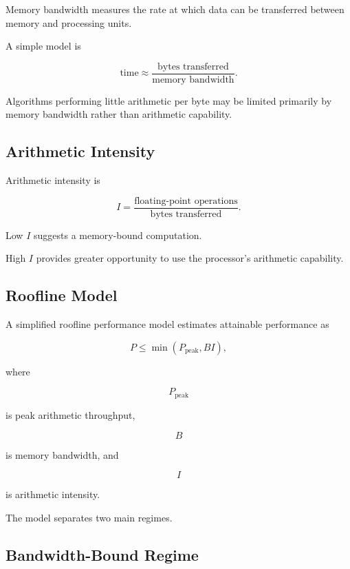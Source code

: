 Memory bandwidth measures the rate at which data can be transferred
between memory and processing units.

A simple model is

\[
\boxed{
\text{time}
\approx
\frac{
\text{bytes transferred}
}{
\text{memory bandwidth}
}.
}
\]

Algorithms performing little arithmetic per byte may be limited primarily
by memory bandwidth rather than arithmetic capability.

\subsection{Arithmetic Intensity}
\label{subsec:hpmc-arithmetic-intensity}

Arithmetic intensity is

\[
\boxed{
I
=
\frac{
\text{floating-point operations}
}{
\text{bytes transferred}
}.
}
\]

Low \(I\) suggests a memory-bound computation.

High \(I\) provides greater opportunity to use the processor's arithmetic
capability.

\subsection{Roofline Model}
\label{subsec:roofline-model}

A simplified roofline performance model estimates attainable performance
as

\[
\boxed{
P
\leq
\min
\left(
P_{\mathrm{peak}},
B I
\right),
}
\]

where

\[
P_{\mathrm{peak}}
\]

is peak arithmetic throughput,

\[
B
\]

is memory bandwidth, and

\[
I
\]

is arithmetic intensity.

The model separates two main regimes.

\subsection{Bandwidth-Bound Regime}
\label{subsec:bandwidth-bound-regime}

